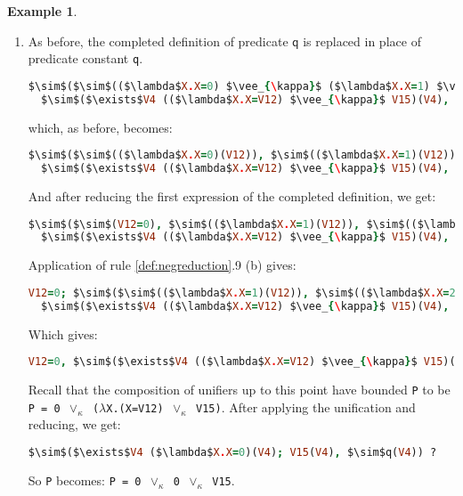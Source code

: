 \documentclass[inscr,ack,preface]{dithesis}
\theoremstyle{definition}
\newtheorem{example}{Example}[chapter]
\newcommand{\msf}[1]{$\mathsf{#1}$}
\begin{document}
\begin{example}
\begin{enumerate}
\item As before, the completed definition of predicate \msf{q} is replaced in place of predicate constant \texttt{q}.
\begin{lstlisting}[language=Prolog,%
  frame=single,breaklines=false,mathescape=true]
  $\sim$($\sim$(($\lambda$X.X=0) $\vee_{\kappa}$ ($\lambda$X.X=1) $\vee_{\kappa}$ ($\lambda$X.X=2))(V12)),
  $\sim$($\exists$V4 (($\lambda$X.X=V12) $\vee_{\kappa}$ V15)(V4), $\sim$q(V4)) ?
\end{lstlisting}
which, as before, becomes:
\begin{lstlisting}[language=Prolog,%
  frame=single,breaklines=false,mathescape=true]
  $\sim$($\sim$(($\lambda$X.X=0)(V12)), $\sim$(($\lambda$X.X=1)(V12)), $\sim$(($\lambda$X.X=2)(V12))),
  $\sim$($\exists$V4 (($\lambda$X.X=V12) $\vee_{\kappa}$ V15)(V4), $\sim$q(V4)) ?
\end{lstlisting}
And after reducing the first expression of the completed definition, we get:
\begin{lstlisting}[language=Prolog,%
  frame=single,breaklines=false,mathescape=true]
  $\sim$($\sim$(V12=0), $\sim$(($\lambda$X.X=1)(V12)), $\sim$(($\lambda$X.X=2)(V12))),
  $\sim$($\exists$V4 (($\lambda$X.X=V12) $\vee_{\kappa}$ V15)(V4), $\sim$q(V4)) ?
\end{lstlisting}
Application of rule \ref{def:negreduction}.9 (b) gives:
\begin{lstlisting}[language=Prolog,%
  frame=single,breaklines=false,mathescape=true]
  V12=0; $\sim$($\sim$(($\lambda$X.X=1)(V12)), $\sim$(($\lambda$X.X=2)(V12))),
  $\sim$($\exists$V4 (($\lambda$X.X=V12) $\vee_{\kappa}$ V15)(V4), $\sim$q(V4)) ?
\end{lstlisting}
Which gives:
\begin{lstlisting}[language=Prolog,%
  frame=single,breaklines=false,mathescape=true]
  V12=0, $\sim$($\exists$V4 (($\lambda$X.X=V12) $\vee_{\kappa}$ V15)(V4), $\sim$q(V4)) ?
\end{lstlisting}
Recall that the composition of unifiers up to this point have bounded \texttt{P} to be \texttt{P = 0 $\vee_{\kappa}$ ($\lambda$X.(X=V12) $\vee_{\kappa}$ V15)}. After applying the unification and reducing, we get:
\begin{lstlisting}[language=Prolog,%
  frame=single,breaklines=false,mathescape=true]
$\sim$($\exists$V4 ($\lambda$X.X=0)(V4); V15(V4), $\sim$q(V4)) ?
\end{lstlisting}
So \texttt{P} becomes: \texttt{P = 0 $\vee_{\kappa}$ 0 $\vee_{\kappa}$ V15}.


\end{enumerate}
\end{example}
\end{document}
